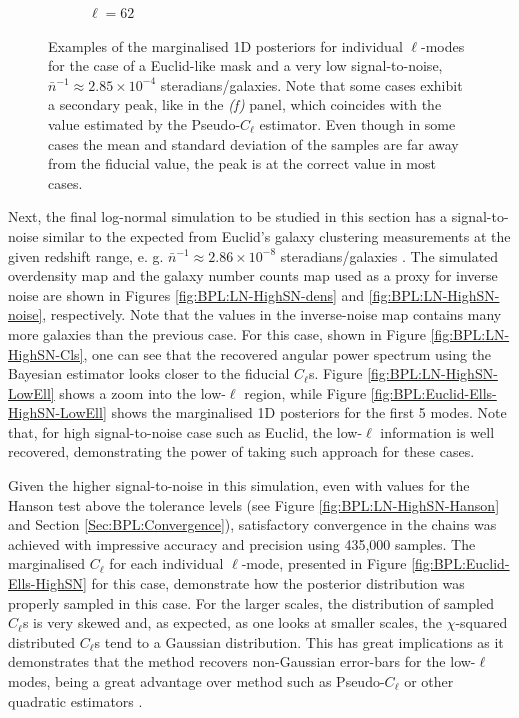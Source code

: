 \begin{figure}
\begin{subfigure}{.5\textwidth}
  \caption{$\ell = 62$}
\end{subfigure}
\caption[Examples of marginalised 1D posteriors for individual $\ell$-modes for the case of a Euclid-like mask and a very low signal-to-noise.]{Examples of the marginalised 1D posteriors for individual $\ell$-modes for the case of a Euclid-like mask and a very low signal-to-noise, $\bar{n}^{-1}\approx 2.85\times 10^{-4}$ steradians/galaxies. Note that some cases exhibit a secondary peak, like in the \textit{(f)} panel, which coincides with the value estimated by the Pseudo-$C_{\ell}$ estimator. Even though in some cases the mean and standard deviation of the samples are far away from the fiducial value, the peak is at the correct value in most cases.}
\label{fig:BPL:Euclid-Ells}
\end{figure}

\qquad Next, the final log-normal simulation to be studied in this section has a signal-to-noise similar to the expected from Euclid's galaxy clustering measurements at the given redshift range, e. g. $\bar{n}^{-1}\approx 2.86\times 10^{-8}$ steradians/galaxies \citep{2011EuclidRedPaper}. The simulated overdensity map and the galaxy number counts map used as a proxy for inverse noise are shown in Figures \ref{fig:BPL:LN-HighSN-dens} and \ref{fig:BPL:LN-HighSN-noise}, respectively. Note that the values in the inverse-noise map contains many more galaxies than the previous case. For this case, shown in Figure \ref{fig:BPL:LN-HighSN-Cls}, one can see that the recovered angular power spectrum using the Bayesian estimator looks closer to the fiducial $C_{\ell}$s. Figure \ref{fig:BPL:LN-HighSN-LowEll} shows a zoom into the low-$\ell$ region, while Figure \ref{fig:BPL:Euclid-Ells-HighSN-LowEll} shows the marginalised 1D posteriors for the first 5 modes. Note that, for high signal-to-noise case such as Euclid, the low-$\ell$ information is well recovered, demonstrating the power of taking such approach for these cases.

\qquad Given the higher signal-to-noise in this simulation, even with values for the Hanson test above the tolerance levels (see Figure \ref{fig:BPL:LN-HighSN-Hanson} and Section \ref{Sec:BPL:Convergence}), satisfactory convergence in the chains was achieved with impressive accuracy and precision using 435,000 samples. The marginalised $C_{\ell}$ for each individual $\ell$-mode, presented in Figure \ref{fig:BPL:Euclid-Ells-HighSN} for this case, demonstrate how the posterior distribution was properly sampled in this case. For the larger scales, the distribution of sampled $C_{\ell}$s is very skewed and, as expected, as one looks at smaller scales, the $\chi$-squared distributed $C_{\ell}$s tend to a Gaussian distribution. This has great implications as it demonstrates that the method recovers non-Gaussian error-bars for the low-$\ell$ modes, being a great advantage over method such as Pseudo-$C_{\ell}$ or other quadratic estimators \citep{Efstat2004,Boris2013}. 

